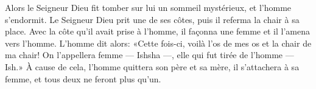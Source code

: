 Alors le Seigneur Dieu fit tomber sur lui un sommeil mystérieux,
	et l’homme s’endormit.
Le Seigneur Dieu prit une de ses côtes, puis il referma la chair à sa place.
Avec la côte qu’il avait prise à l’homme,
	il façonna une femme et il l’amena vers l’homme.
L’homme dit alors:
	«Cette fois-ci, voilà l’os de mes os et la chair de ma chair!
	On l’appellera femme --- Ishsha ---, elle qui fut tirée de l’homme --- Ish.»
À cause de cela, l’homme quittera son père et sa mère,
	il s’attachera à sa femme, et tous deux ne feront plus qu’un.
